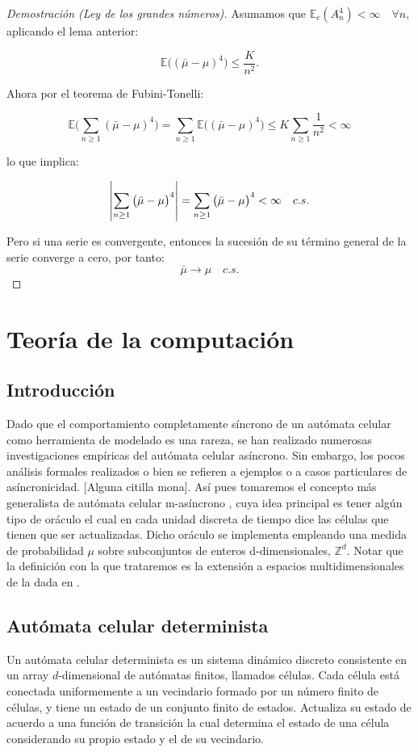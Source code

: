 \documentclass[../proyecto.tex]{memoir}
\begin{document}
\begin{proof}[Demostración (Ley de los grandes números)]

Asumamos que $\mathds{E}_c( A_n^4) < \infty \quad \forall n$, aplicando el lema anterior:

$$
	\mathds{E} \big( ( \bar{ \mu } - \mu ) ^ 4 \big) \leq \frac{K}{n^{2}}.
$$

Ahora por el teorema de Fubini-Tonelli:

$$
	\mathds{E} \big( \sum_{n \geq 1}( \bar{ \mu } - \mu ) ^ 4 \big) = \sum_{n \geq 1} \mathds{E} \big( ( \bar{ \mu } - \mu ) ^ 4 \big)  \leq K\sum_{n \geq 1}\frac{1}{n^{2}} < \infty
$$

lo que implica:

$$
\abs{ \sum_{n \geq 1} \big( \bar{ \mu } - \mu \big)^ 4 } = \sum_{n \geq 1} \big( \bar{ \mu } - \mu \big)^ 4 < \infty \quad c.s. 
$$

Pero si una serie es convergente, entonces la sucesión de su término general de la serie converge a cero, por tanto:
$$
 \bar{ \mu } \to \mu \quad c.s.
$$
\end{proof}

\section{Teoría de la computación}

\subsection{Introducción}
Dado que el comportamiento completamente síncrono de un autómata celular como herramienta de modelado es una rareza, se han realizado numerosas investigaciones empíricas del autómata celular asíncrono. Sin embargo, los pocos análisis formales realizados o bien se refieren a ejemplos o a casos particulares de asíncronicidad. [Alguna citilla mona]. Así pues tomaremos el concepto más generalista de autómata celular m-asíncrono \cite{oraculo}, cuya idea principal es tener algún tipo de oráculo el cual en cada unidad discreta de tiempo dice las células que tienen que ser actualizadas. Dicho oráculo se implementa empleando una medida de probabilidad $\mu$ sobre subconjuntos de enteros d-dimensionales, $\mathds{Z}^{d}$. Notar que la definición con la que trataremos es la extensión a espacios multidimensionales de la dada en \cite{oraculo}.

\subsection{Autómata celular determinista}
Un autómata celular determinista es un sistema dinámico discreto consistente en un array $d$-dimensional de autómatas finitos, llamados células. Cada célula está conectada uniformemente a un vecindario formado por un número finito de células, y tiene un estado de un conjunto finito de estados. Actualiza su estado de acuerdo a una función de transición la cual determina el estado de una célula considerando su propio estado y el de su vecindario. 
\end{document}
